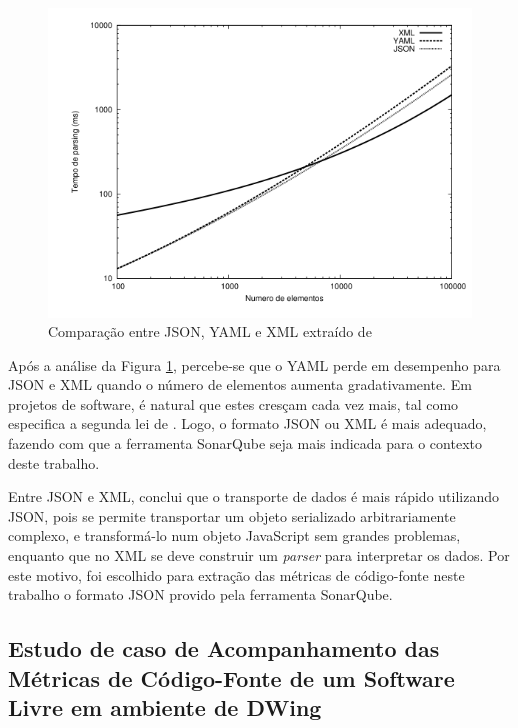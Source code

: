 \begin{figure}[ht!]
\begin{center}
\includegraphics[bb=0 0 556 300, scale=1]{figuras/grafico.png}
\caption{Comparação entre JSON, YAML e XML extraído de }
\label{jsonvsyaml}
\end{center}
\end{figure}
\FloatBarrier

Após a análise da Figura \ref{jsonvsyaml}, percebe-se que o YAML perde em desempenho para JSON e XML quando o número de elementos aumenta gradativamente. Em projetos de software, é natural que estes cresçam cada vez mais, tal como especifica a segunda lei de . Logo, o formato JSON ou XML é mais adequado, fazendo com que a ferramenta SonarQube seja mais indicada para o contexto deste trabalho.

Entre JSON e XML,  conclui que o transporte de dados é mais rápido utilizando JSON, pois se permite transportar
um objeto serializado arbitrariamente complexo, e transformá-lo num objeto
JavaScript sem grandes problemas, enquanto que no XML se deve construir um \textit{parser} para interpretar os dados. Por este motivo, foi escolhido para extração das métricas de código-fonte neste trabalho o formato JSON provido pela ferramenta SonarQube. 


\subsection{Estudo de caso de Acompanhamento das Métricas de Código-Fonte de um Software Livre em ambiente de DWing}

